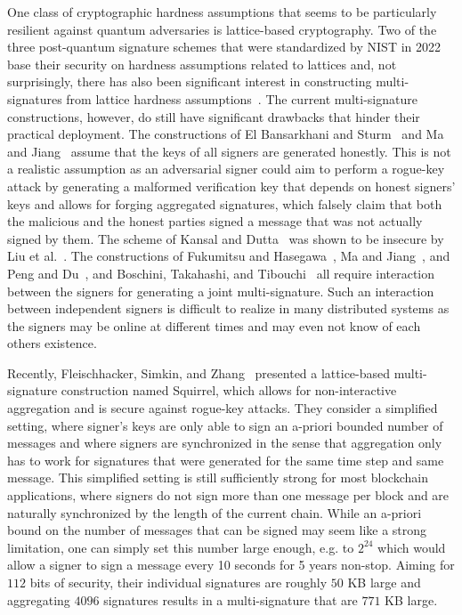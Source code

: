 One class of cryptographic hardness assumptions that seems to be particularly resilient against quantum adversaries is lattice-based cryptography.
Two of the three post-quantum signature schemes that were standardized by NIST in 2022 base their security on hardness assumptions related to lattices and, not surprisingly, there has also been significant interest in constructing multi-signatures from lattice hardness assumptions~\cite{CANS:ElBStu16,FukHas19,MaJia19,PenDu20,AFRICACRYPT:KanDut20,PROVSEC:FukHas20,PKC:DOTT21,C:BosTakTib22, CCS:FleSimZha22}.
The current multi-signature constructions, however, do still have significant drawbacks that hinder their practical deployment.
The constructions of El Bansarkhani and Sturm~\cite{CANS:ElBStu16} and Ma and Jiang~\cite{MaJia19} assume that the keys of all signers are generated honestly. 
This is not a realistic assumption as an adversarial signer could aim to perform a rogue-key attack by generating a malformed verification key that depends on honest signers' keys and allows for forging aggregated signatures, which falsely claim that both the malicious and the honest parties signed a message that was not actually signed by them.
The scheme of Kansal and Dutta~\cite{AFRICACRYPT:KanDut20} was shown to be insecure by Liu et al.~\cite{EPRINT:LiuTseTso20b}.
The constructions of Fukumitsu and Hasegawa~\cite{FukHas19,PROVSEC:FukHas20}, Ma and Jiang~\cite{MaJia19}, and Peng and Du~\cite{PenDu20}, and Boschini, Takahashi, and Tibouchi~\cite{C:BosTakTib22} all require interaction between the signers for generating a joint multi-signature.
Such an interaction between independent signers is difficult to realize in many distributed systems as the signers may be online at different times and may even not know of each others existence.

Recently, Fleischhacker, Simkin, and Zhang~\cite{CCS:FleSimZha22} presented a lattice-based multi-signature construction named Squirrel, which allows for non-interactive aggregation and is secure against rogue-key attacks.
They consider a simplified setting, where signer's keys are only able to sign an a-priori bounded number of messages and where signers are synchronized in the sense that aggregation only has to work for signatures that were generated for the same time step and same message.
This simplified setting is still sufficiently strong for most blockchain applications, where signers do not sign more than one message per block and are naturally synchronized by the length of the current chain.
While an a-priori bound on the number of messages that can be signed may seem like a strong limitation, one can simply set this number large enough, e.g. to $2^{24}$ which would allow a signer to sign a message every 10 seconds for 5 years non-stop.
Aiming for $112$ bits of security, their individual signatures are roughly $50$ KB large and aggregating $4096$ signatures results in a multi-signature that are $771$ KB large.

